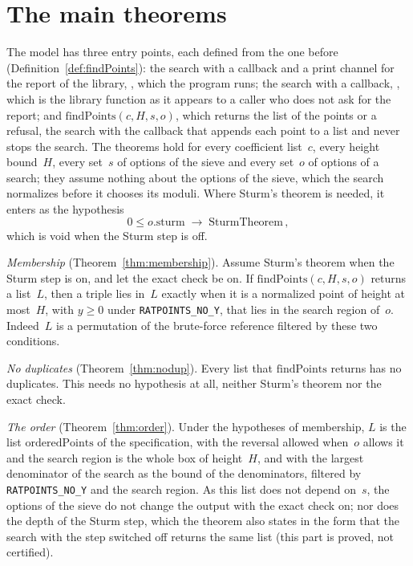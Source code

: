 \section{The main theorems}\label{sec:overviewTheorems}

The model has three entry points, each defined from the one before
(Definition~\ref{def:findPoints}): the search with a callback and a print channel for the report of
the library, , which the program runs; the search with a
callback, , which is the library function as it appears to a caller
who does not ask for the report; and $\mathrm{findPoints}(c, H, s, o)$, which returns the list of
the points or a refusal, the search with the callback that appends each point to a list and never
stops the search. The theorems hold for every coefficient list~$c$, every height bound~$H$, every
set~$s$ of options of the sieve and every set~$o$ of options of a search; they assume nothing about
the options of the sieve, which the search normalizes before it chooses its moduli. Where Sturm's
theorem is needed, it enters as the hypothesis
\[ 0 \le o.\mathrm{sturm} \;\to\; \mathrm{SturmTheorem}\,, \]
which is void when the Sturm step is off.

\emph{Membership} (Theorem~\ref{thm:membership}). Assume Sturm's theorem when the Sturm step is on,
and let the exact check be on. If $\mathrm{findPoints}(c, H, s, o)$ returns a list~$L$, then a
triple lies in~$L$ exactly when it is a normalized point of height at most~$H$, with $y \ge 0$
under \verb|RATPOINTS_NO_Y|, that lies in the search region of~$o$. Indeed~$L$ is a permutation of
the brute-force reference filtered by these two conditions.

\emph{No duplicates} (Theorem~\ref{thm:nodup}). Every list that $\mathrm{findPoints}$ returns has
no duplicates. This needs no hypothesis at all, neither Sturm's theorem nor the exact check.

\emph{The order} (Theorem~\ref{thm:order}). Under the hypotheses of membership, $L$ is the list
$\mathrm{orderedPoints}$ of the specification, with the reversal allowed when~$o$ allows it and the
search region is the whole box of height~$H$, and with the largest denominator of the search as the
bound of the denominators, filtered by \verb|RATPOINTS_NO_Y| and the search region. As this list
does not depend on~$s$, the options of the sieve do not change the output with the exact check on;
nor does the depth of the Sturm step, which the theorem also states in the form that the search
with the step switched off returns the same list (this part is proved, not certified).

